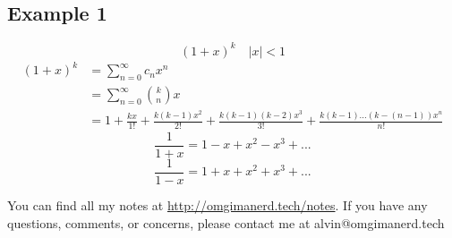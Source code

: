 \documentclass[letterpaper, 12pt]{math}
\begin{document}
\subsection*{Example 1}
\[ (1+x)^{k} \quad |x| < 1 \]
\begin{align*}
  (1+x)^{k} &= \sum_{n=0}^{\infty}c_{n}x^{n} \\
  &= \sum_{n=0}^{\infty}\binom{k}{n}x \\
  &= 1+\frac{kx}{1!}+\frac{k(k-1)x^{2}}{2!}+\frac{k(k-1)(k-2)x^{3}}{3!}
    +\frac{k(k-1)...(k-(n-1))x^{n}}{n!}
\end{align*}
\[ \frac{1}{1+x} = 1-x+x^{2}-x^{3}+... \]
\[ \frac{1}{1-x} = 1+x+x^{2}+x^{3}+... \]

\begin{center}
  You can find all my notes at \url{http://omgimanerd.tech/notes}. If you have
  any questions, comments, or concerns, please contact me at
  alvin@omgimanerd.tech
\end{center}
\end{document}
